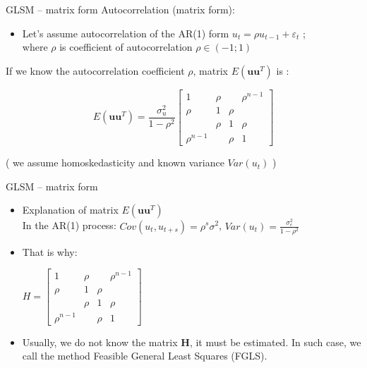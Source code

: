 \documentclass{beamer}
\begin{document}

\begin{frame}{GLSM – matrix form}
Autocorrelation (matrix form):
\begin{itemize}
\item Let's assume autocorrelation of the AR(1) form $u_t = \rho u_{t-1}+ \varepsilon_t$  ; \\ where $\rho$ is coefficient of autocorrelation $\rho \in (-1; 1)$
\end{itemize}
\vspace{0.2cm}
If we know the autocorrelation coefficient $\rho$,  matrix $E(\boldsymbol{uu}^T)$ is :

$$E(\boldsymbol{uu}^T)=\frac{\sigma^2_{u}}{1-\rho^2}
    \begin{bmatrix}
    1&  \rho &  & \rho^{n-1}\\
    \rho &  1&  \rho & \\ 
     &  \rho &  1& \rho\\ 
     \rho^{n-1} &  & \rho &1 
\end{bmatrix}$$

( we assume homoskedasticity and known variance $\textit{Var}(u_t)$ )
\end{frame}


\begin{frame}{GLSM – matrix form}
\begin{itemize}
\item Explanation of matrix $E(\boldsymbol{uu}^T)$\\
In the AR(1) process: $Cov(u_t,u_{t+s})=\rho^s \sigma^2$, $Var(u_t)=\frac{\sigma^2_e}{1-\rho^2}$
\vspace{0.3cm}
\item That is why: 

$H=\begin{bmatrix}
 1&  \rho &  & \rho^{n-1}\\
 \rho &  1&  \rho & \\ 
 &  \rho &  1& \rho\\ 
\rho^{n-1} &  & \rho &1 
\end{bmatrix}$
\vspace{0.3cm}
\item Usually, we do not know the matrix $\boldsymbol{H}$, it must be estimated. In such case, we call the method Feasible General Least Squares (FGLS).
\end{itemize}
\end{frame}
\end{document}
